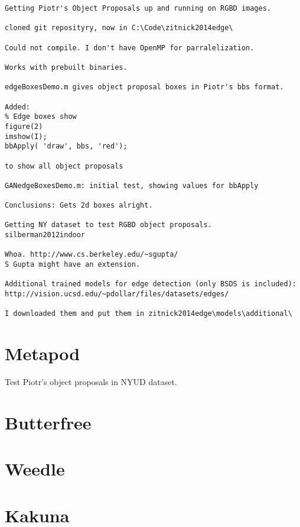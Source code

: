 \begin{lstlisting}
Getting Piotr's Object Proposals up and running on RGBD images.

cloned git reposityry, now in C:\Code\zitnick2014edge\

Could not compile. I don't have OpenMP for parralelization.

Works with prebuilt binaries.

edgeBoxesDemo.m gives object proposal boxes in Piotr's bbs format.

Added:
% Edge boxes show
figure(2)
imshow(I);
bbApply( 'draw', bbs, 'red');

to show all object proposals

GANedgeBoxesDemo.m: initial test, showing values for bbApply

Conclusions: Gets 2d boxes alright.

Getting NY dataset to test RGBD object proposals.
silberman2012indoor

Whoa. http://www.cs.berkeley.edu/~sgupta/
S Gupta might have an extension.

Additional trained models for edge detection (only BSDS is included):
http://vision.ucsd.edu/~pdollar/files/datasets/edges/

I downloaded them and put them in zitnick2014edge\models\additional\

\end{lstlisting}

\section{Metapod}
\label{exp:Metapod}
Test Piotr's object proposals in NYUD dataset. 


\section{Butterfree}
\label{exp:Butterfree}


\section{Weedle}
\label{exp:Weedle}
\section{Kakuna}
\label{exp:Kakuna}

